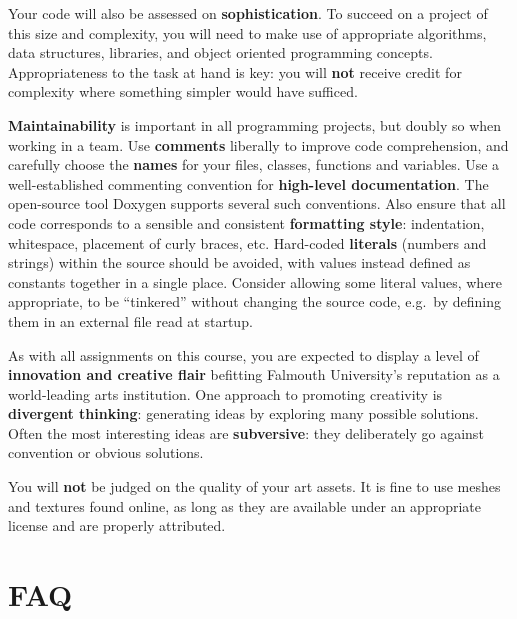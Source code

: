 \documentclass{../../fal_assignment}
\begin{document}
Your code will also be assessed on \textbf{sophistication}.
To succeed on a project of this size and complexity,
you will need to make use of appropriate algorithms, data structures, libraries, and object oriented programming concepts.
Appropriateness to the task at hand is key:
you will \textbf{not} receive credit for complexity  
where something simpler would have sufficed.

\textbf{Maintainability} is important in all programming projects,
but doubly so when working in a team.
Use \textbf{comments} liberally to improve code comprehension,
and carefully choose the \textbf{names} for your files, classes, functions and variables.
Use a well-established commenting convention
for \textbf{high-level documentation}.
The open-source tool Doxygen supports several such conventions.
Also ensure that all code corresponds to a sensible and consistent \textbf{formatting style}:
indentation, whitespace, placement of curly braces, etc.
Hard-coded \textbf{literals} (numbers and strings) within the source should be avoided,
with values instead defined as constants together in a single place.
Consider allowing some literal values, where appropriate, to be ``tinkered'' without changing the source code,
e.g.\ by defining them in an external file read at startup.

As with all assignments on this course, you are expected to display a level of
\textbf{innovation and creative flair} befitting Falmouth University's reputation as a world-leading
arts institution.
One approach to promoting creativity is
\textbf{divergent thinking}: generating ideas by exploring many possible solutions.
Often the most interesting ideas are \textbf{subversive}: they deliberately go against
convention or obvious solutions.

You will \textbf{not} be judged on the quality of your art assets.
It is fine to use meshes and textures found online,
as long as they are available under an appropriate license and are properly attributed.

\section*{FAQ}
\end{document}
